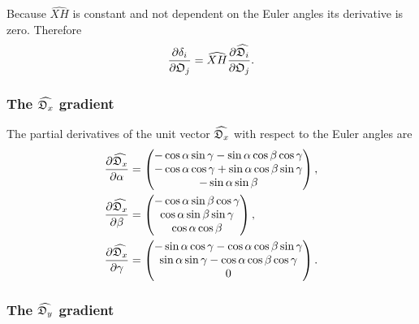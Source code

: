 \noindent Because $\widehat{XH}$ is constant and not dependent on the Euler angles its derivative is zero.  Therefore
\begin{equation}
    \frac{\partial \delta_i}{\partial \mathfrak{O}_j} = \widehat{XH} \frac{\partial \widehat{\mathfrak{D}_i}}{\partial \mathfrak{O}_j}.
\end{equation}



\subsubsection{The $\widehat{\mathfrak{D}_x}$ gradient}

The partial derivatives of the unit vector $\widehat{\mathfrak{D}_x}$ with respect to the Euler angles are
\begin{subequations}
\begin{align}
    \frac{\partial \widehat{\mathfrak{D}_x}}{\partial \alpha} &= \begin{pmatrix}
        -\cos \alpha \sin \gamma - \sin \alpha \cos \beta \cos \gamma \\
        -\cos \alpha \cos \gamma + \sin \alpha \cos \beta \sin \gamma \\
        -\sin \alpha \sin \beta \\
    \end{pmatrix}, \\
    \frac{\partial \widehat{\mathfrak{D}_x}}{\partial \beta} &= \begin{pmatrix}
        -\cos \alpha \sin \beta \cos \gamma \\
        \cos \alpha \sin \beta \sin \gamma \\
        \cos \alpha \cos \beta \\
    \end{pmatrix}, \\
    \frac{\partial \widehat{\mathfrak{D}_x}}{\partial \gamma} &= \begin{pmatrix}
        -\sin \alpha \cos \gamma - \cos \alpha \cos \beta \sin \gamma \\
        \sin \alpha \sin \gamma - \cos \alpha \cos \beta \cos \gamma \\
        0 \\
    \end{pmatrix}.
\end{align}
\end{subequations}



\subsubsection{The $\widehat{\mathfrak{D}_y}$ gradient}

